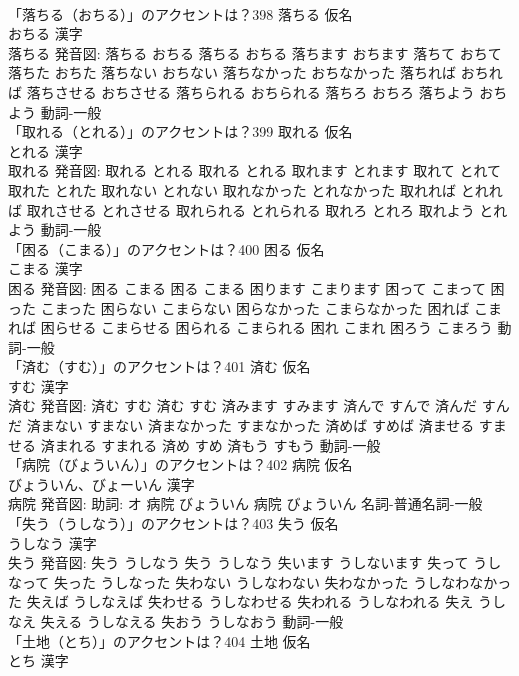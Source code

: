 \documentclass[8pt]{extreport}
\begin{document}
\begin{CJK}{UTF8}{min}
\\	「落ちる（おちる）」のアクセントは？398	落ちる 仮名　
\\	おちる 漢字　
\\	落ちる 発音図:	落ちる おちる		落ちる おちる 落ちます おちます 落ちて おちて 落ちた おちた 落ちない おちない 落ちなかった おちなかった 落ちれば おちれば 落ちさせる おちさせる 落ちられる おちられる 落ちろ おちろ 落ちよう おちよう				動詞-一般 
\\	「取れる（とれる）」のアクセントは？399	取れる 仮名　
\\	とれる 漢字　
\\	取れる 発音図:	取れる とれる		取れる とれる 取れます とれます 取れて とれて 取れた とれた 取れない とれない 取れなかった とれなかった 取れれば とれれば 取れさせる とれさせる 取れられる とれられる 取れろ とれろ 取れよう とれよう				動詞-一般 
\\	「困る（こまる）」のアクセントは？400	困る 仮名　
\\	こまる 漢字　
\\	困る 発音図:	困る こまる		困る こまる 困ります こまります 困って こまって 困った こまった 困らない こまらない 困らなかった こまらなかった 困れば こまれば 困らせる こまらせる 困られる こまられる 困れ こまれ 困ろう こまろう				動詞-一般 
\\	「済む（すむ）」のアクセントは？401	済む 仮名　
\\	すむ 漢字　
\\	済む 発音図:	済む すむ		済む すむ 済みます すみます 済んで すんで 済んだ すんだ 済まない すまない 済まなかった すまなかった 済めば すめば 済ませる すませる 済まれる すまれる 済め すめ 済もう すもう				動詞-一般 
\\	「病院（びょういん）」のアクセントは？402	病院 仮名　
\\	びょういん、びょーいん 漢字　
\\	病院 発音図: 助詞: オ	病院 びょういん		病院 びょういん				名詞-普通名詞-一般 
\\	「失う（うしなう）」のアクセントは？403	失う 仮名　
\\	うしなう 漢字　
\\	失う 発音図:	失う うしなう		失う うしなう 失います うしないます 失って うしなって 失った うしなった 失わない うしなわない 失わなかった うしなわなかった 失えば うしなえば 失わせる うしなわせる 失われる うしなわれる 失え うしなえ 失える うしなえる 失おう うしなおう				動詞-一般 
\\	「土地（とち）」のアクセントは？404	土地 仮名　
\\	とち 漢字　

\end{CJK}
\end{document}
